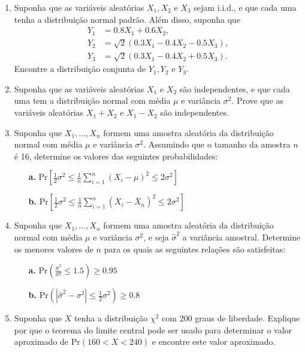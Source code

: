 \begin{enumerate}
    \item Suponha que as variáveis aleatórias $X_1, X_2$ e $X_3$ sejam i.i.d., e que cada uma tenha a distribuição normal padrão. Além disso, suponha que
    \begin{align*}
        Y_1 &= 0.8X_1 + 0.6X_2, \\
        Y_2 &= \sqrt{2}(0.3X_1 - 0.4X_2 - 0.5X_3), \\
        Y_3 &= \sqrt{2}(0.3X_1 - 0.4X_2 + 0.5X_3).
    \end{align*}
    Encontre a distribuição conjunta de $Y_1, Y_2$ e $Y_3$.

    \item Suponha que as variáveis aleatórias $X_1$ e $X_2$ são independentes, e que cada uma tem a distribuição normal com média $\mu$ e variância $\sigma^2$. Prove que as variáveis aleatórias $X_1 + X_2$ e $X_1 - X_2$ são independentes.

    \item Suponha que $X_1, \dots, X_n$ formem uma amostra aleatória da distribuição normal com média $\mu$ e variância $\sigma^2$. Assumindo que o tamanho da amostra $n$ é 16, determine os valores das seguintes probabilidades:
    \begin{enumerate}
        \item[\textbf{a.}] $\text{Pr}\left[\frac{1}{2}\sigma^2 \le \frac{1}{n}\sum_{i=1}^{n}(X_i - \mu)^2 \le 2\sigma^2\right]$
        \item[\textbf{b.}] $\text{Pr}\left[\frac{1}{2}\sigma^2 \le \frac{1}{n}\sum_{i=1}^{n}(X_i - \bar{X}_n)^2 \le 2\sigma^2\right]$
    \end{enumerate}

    \item Suponha que $X_1, \dots, X_n$ formem uma amostra aleatória da distribuição normal com média $\mu$ e variância $\sigma^2$, e seja $\hat{\sigma}^2$ a variância amostral. Determine os menores valores de $n$ para os quais as seguintes relações são satisfeitas:
    \begin{enumerate}
        \item[\textbf{a.}] $\text{Pr}\left(\frac{\hat{\sigma}^2}{\sigma^2} \le 1.5\right) \ge 0.95$
        \item[\textbf{b.}] $\text{Pr}\left(|\hat{\sigma}^2 - \sigma^2| \le \frac{1}{2}\sigma^2\right) \ge 0.8$
    \end{enumerate}

    \item Suponha que $X$ tenha a distribuição $\chi^2$ com 200 graus de liberdade. Explique por que o teorema do limite central pode ser usado para determinar o valor aproximado de $\text{Pr}(160 < X < 240)$ e encontre este valor aproximado.


\end{enumerate}
